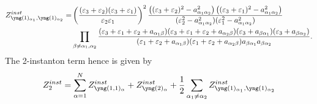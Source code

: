 \documentclass[12pt]{article}
\numberwithin{equation}{section}
\theoremstyle{definition}
\begin{document}
\begin{align*}
Z^{inst}_{\fontsize{2.5}{4}\selectfont\yng(1)_{\alpha_1 },  \fontsize{2.5}{4}\selectfont\yng(1)_{\alpha_2 }} =&
\left( \frac{(\varepsilon_3 + \varepsilon_2 )(\varepsilon_3 + \varepsilon_1 )}{\varepsilon_2 \varepsilon_1 }\right)^2 \frac{\left((\varepsilon_3 + \varepsilon_2 )^2 - a_{\alpha_1 \alpha_2}^2\right) \left( (\varepsilon_3 + \varepsilon_1 )^2 - a_{\alpha_1 \alpha_2 }^2\right)}{(\varepsilon_2^2 - a_{\alpha_1 \alpha_2 }^2)(\varepsilon_1^2 - a_{\alpha_1 \alpha_2}^2)} \\
&\prod\limits_{\beta \neq \alpha_1 , \alpha_2} 
\frac{(\varepsilon_3 + \varepsilon_1 + \varepsilon_2 + a_{\alpha_1 \beta})(\varepsilon_3 + \varepsilon_1 + \varepsilon_2 + a_{\alpha_2 \beta})(\varepsilon_3 + a_{\beta \alpha_1})(\varepsilon_3 + a_{\beta \alpha_2 })}{(\varepsilon_1 + \varepsilon_2 + a_{\alpha_1 \beta})(\varepsilon_1 + \varepsilon_2 + a_{\alpha_2 \beta})a_{\beta \alpha_1} a_{\beta \alpha_2 }}.
\end{align*}
The 2-instanton term hence is given by
\begin{align*}
    Z^{inst}_{2} = \sum\limits_{\alpha = 1}^{N} Z^{inst}_{\fontsize{2.5}{4}\selectfont\yng(1,1)_{\alpha}} + Z^{inst}_{\fontsize{2.5}{4}\selectfont\yng(2)_{\alpha}} + \frac{1}{2}\sum\limits_{\alpha_1 \neq \alpha_2} Z^{inst}_{\fontsize{2.5}{4}\selectfont\yng(1)_{\alpha_1 },  \fontsize{2.5}{4}\selectfont\yng(1)_{\alpha_2 }}
\end{align*}
\end{document}
